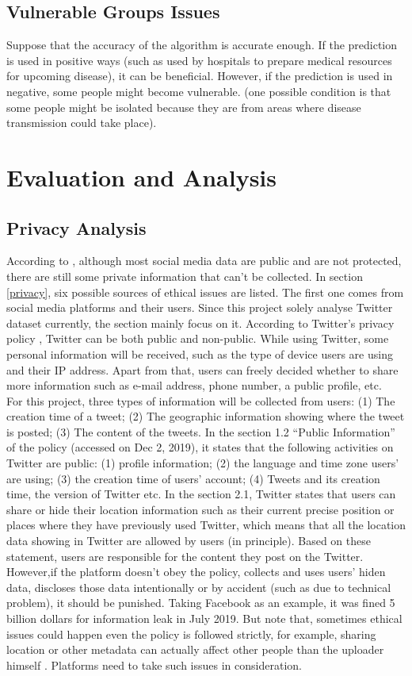 \subsection{Vulnerable Groups Issues}
Suppose that the accuracy of the algorithm is accurate enough. If the prediction is used in positive ways (such as used by hospitals to prepare medical resources for upcoming disease), it can be beneficial. However, if the prediction is used in negative, some people might become vulnerable. (one possible condition is that some people might be isolated because they are from areas where disease transmission could take place).
\section{Evaluation and Analysis}
\subsection{Privacy Analysis}
According to \cite{felt2008privacy}, although most social media data are public and are not protected, there are still some private information that can't be collected. 
In section \ref{privacy}, six possible sources of ethical issues are listed. The first one comes from social media platforms and their users. Since this project solely analyse Twitter dataset currently, the section mainly focus on it. According to Twitter's privacy policy \cite{twitter_pri}, Twitter can be both public and non-public. While using Twitter, some personal information will be received, such as the type of device users are using and their IP address. Apart from that, users can freely decided whether to share more information such as e-mail address, phone number, a public profile, etc. \\
For this project, three types of information will be collected from users: (1) The creation time of a tweet; (2) The geographic information showing where the tweet is posted; (3) The content of the tweets. In the section 1.2 ``Public Information'' of the policy (accessed on Dec 2, 2019), it states that the following activities on Twitter are public: (1) profile information; (2) the language and time zone users' are using; (3) the creation time of users' account; (4) Tweets and its creation time, the version of Twitter etc.
In the section 2.1, Twitter states that users can share or hide their location information such as their current precise position or places where they have previously used Twitter, which means that all the location data showing in Twitter are allowed by users (in principle). Based on these statement, users are responsible for the content they post on the Twitter. However,if the platform doesn't obey the policy, collects and uses users' hiden data, discloses those data intentionally or by accident (such as due to technical problem), it should be punished. Taking Facebook as an example, it was fined 5 billion dollars for information leak in July 2019. But note that, sometimes ethical issues could happen even the policy is followed strictly, for example, sharing location or other metadata can actually affect other people than the uploader himself \cite{smith2012big}. Platforms need to take such issues in consideration.\\\\
